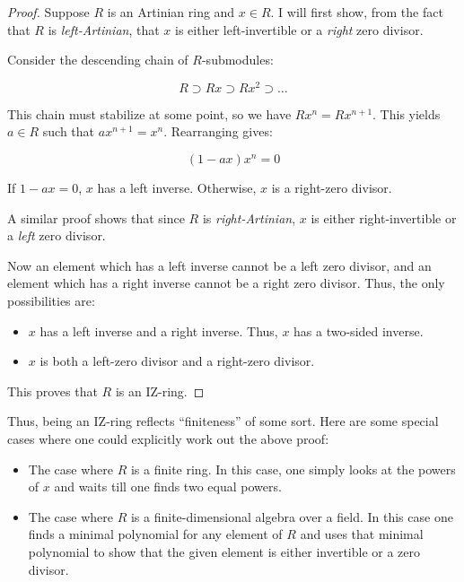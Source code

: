 \documentclass[a4paper]{amsart}
\begin{document}
\begin{proof}
  Suppose $R$ is an Artinian ring and $x \in R$. I will first show,
  from the fact that $R$ is {\em left-Artinian}, that $x$ is either
  left-invertible or a {\em right} zero divisor.

  Consider the descending chain of $R$-submodules:

  $$R \supset Rx \supset Rx^2 \supset \ldots$$

  This chain must stabilize at some point, so we have $Rx^n = Rx^{n+1}$.
  This yields $a \in R$ such that $ax^{n+1} = x^n$. Rearranging gives:

  $$(1 - ax)x^n= 0$$

  If $1 - ax = 0$, $x$ has a left inverse. Otherwise, $x$ is a
  right-zero divisor.

  A similar proof shows that since $R$ is {\em right-Artinian}, $x$ is
  either right-invertible or a {\em left} zero divisor.

  Now an element which has a left inverse cannot be a left zero
  divisor, and an element which has a right inverse cannot be a right
  zero divisor. Thus, the only possibilities are:

  \begin{itemize}

  \item $x$ has a left inverse and a right inverse. Thus, $x$ has a
    two-sided inverse.

  \item $x$ is both a left-zero divisor and a right-zero divisor.

  \end{itemize}

  This proves that $R$ is an IZ-ring.
\end{proof}

Thus, being an IZ-ring reflects ``finiteness'' of some sort. Here are
some special cases where one could explicitly work out the above proof:

\begin{itemize}

\item The case where $R$ is a finite ring. In this case, one simply
  looks at the powers of $x$ and waits till one finds two equal powers.

\item The case where $R$ is a finite-dimensional algebra over a
  field. In this case one finds a minimal polynomial for any element
  of $R$ and uses that minimal polynomial to show that the given
  element is either invertible or a zero divisor.

\end{itemize}
\end{document}
